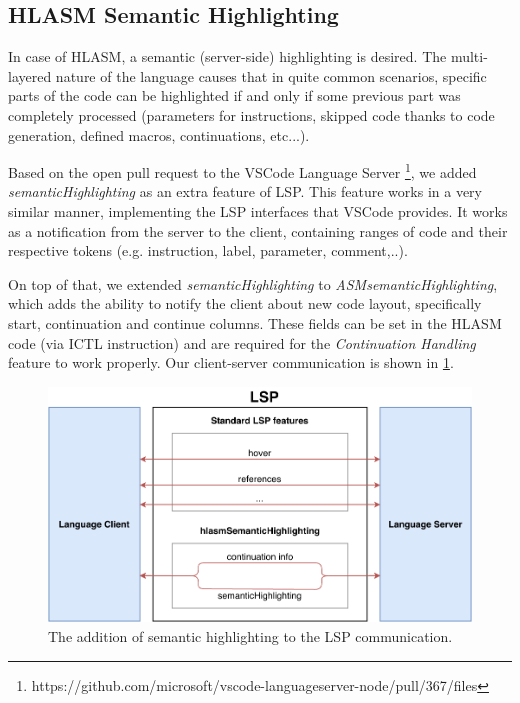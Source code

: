 \subsection{HLASM Semantic Highlighting}

In case of HLASM, a semantic (server-side) highlighting is desired. The multi-layered nature of the language causes that in quite common scenarios, specific parts of the code can be highlighted if and only if some previous part was completely processed (parameters for instructions, skipped code thanks to code generation, defined macros, continuations, etc...).

Based on the open pull request to the VSCode Language Server \footnote{https://github.com/microsoft/vscode-languageserver-node/pull/367/files}, we added \emph{semanticHighlighting} as an extra feature of LSP. This feature works in a very similar manner, implementing the LSP interfaces that VSCode provides. It works as a notification from the server to the client, containing ranges of code and their respective tokens (e.g. instruction, label, parameter, comment,..). 

On top of that, we extended \emph{semanticHighlighting} to \emph{ASMsemanticHighlighting}, which adds the ability to notify the client about new code layout, specifically start, continuation and continue columns. These fields can be set in the HLASM code (via ICTL instruction) and are required for the \emph{Continuation Handling} feature to work properly. Our client-server communication is shown in \cref{fig08:lsp}.


\begin{figure}
	\centering
	\includegraphics[width=\textwidth]{img/lsp_addition}
	\caption{The addition of semantic highlighting to the LSP communication.}
	
	\label{fig08:lsp}
\end{figure}

